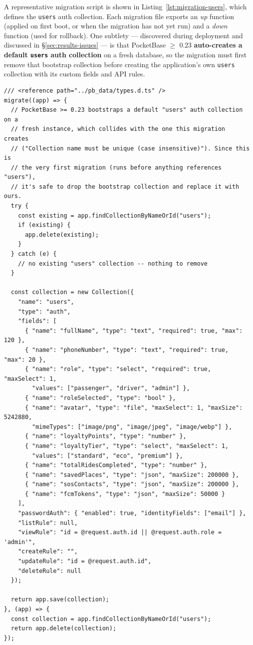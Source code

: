 \documentclass[11pt,a4paper]{article}
\begin{document}
A representative migration script is shown in
Listing~\ref{lst:migration-users}, which defines the \texttt{users} auth
collection. Each migration file exports an \textit{up} function (applied on
first boot, or when the migration has not yet run) and a \textit{down}
function (used for rollback). One subtlety --- discovered during deployment
and discussed in \S\ref{sec:results-issues} --- is that PocketBase $\geq$
0.23 \textbf{auto-creates a default \texttt{users} auth collection} on a fresh
database, so the migration must first remove that bootstrap collection
before creating the application's own \texttt{users} collection with its
custom fields and API rules.

\begin{lstlisting}[language=JSPB,caption={\texttt{pb\_migrations/1700000001\_users.js} --- defines the \texttt{users} auth collection (with the bootstrap-collection guard added during deployment debugging).},label={lst:migration-users}]
/// <reference path="../pb_data/types.d.ts" />
migrate((app) => {
  // PocketBase >= 0.23 bootstraps a default "users" auth collection on a
  // fresh instance, which collides with the one this migration creates
  // ("Collection name must be unique (case insensitive)"). Since this is
  // the very first migration (runs before anything references "users"),
  // it's safe to drop the bootstrap collection and replace it with ours.
  try {
    const existing = app.findCollectionByNameOrId("users");
    if (existing) {
      app.delete(existing);
    }
  } catch (e) {
    // no existing "users" collection -- nothing to remove
  }

  const collection = new Collection({
    "name": "users",
    "type": "auth",
    "fields": [
      { "name": "fullName", "type": "text", "required": true, "max": 120 },
      { "name": "phoneNumber", "type": "text", "required": true, "max": 20 },
      { "name": "role", "type": "select", "required": true, "maxSelect": 1,
        "values": ["passenger", "driver", "admin"] },
      { "name": "roleSelected", "type": "bool" },
      { "name": "avatar", "type": "file", "maxSelect": 1, "maxSize": 5242880,
        "mimeTypes": ["image/png", "image/jpeg", "image/webp"] },
      { "name": "loyaltyPoints", "type": "number" },
      { "name": "loyaltyTier", "type": "select", "maxSelect": 1,
        "values": ["standard", "eco", "premium"] },
      { "name": "totalRidesCompleted", "type": "number" },
      { "name": "savedPlaces", "type": "json", "maxSize": 200000 },
      { "name": "sosContacts", "type": "json", "maxSize": 200000 },
      { "name": "fcmTokens", "type": "json", "maxSize": 50000 }
    ],
    "passwordAuth": { "enabled": true, "identityFields": ["email"] },
    "listRule": null,
    "viewRule": "id = @request.auth.id || @request.auth.role = 'admin'",
    "createRule": "",
    "updateRule": "id = @request.auth.id",
    "deleteRule": null
  });

  return app.save(collection);
}, (app) => {
  const collection = app.findCollectionByNameOrId("users");
  return app.delete(collection);
});
\end{lstlisting}
\end{document}
